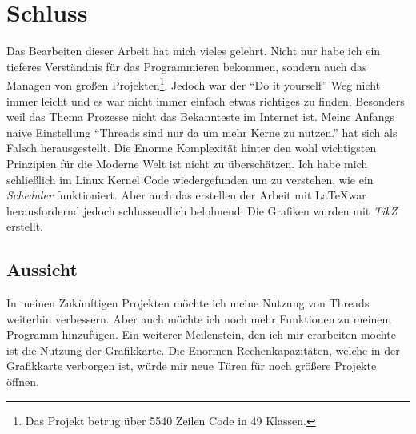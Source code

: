 \section{Schluss}
Das Bearbeiten dieser Arbeit hat mich vieles gelehrt. Nicht nur habe ich ein tieferes Verständnis für das Programmieren bekommen, sondern auch das Managen von großen Projekten\footnote{Das Projekt betrug über 5540 Zeilen Code in 49 Klassen.}. Jedoch war der ``Do it yourself'' Weg nicht immer leicht und es war nicht immer einfach etwas richtiges zu finden. Besonders weil das Thema Prozesse nicht das Bekannteste im Internet ist. Meine Anfangs naive Einstellung ``Threads sind nur da um mehr Kerne zu nutzen.'' hat sich als Falsch herausgestellt. Die Enorme Komplexität hinter den wohl wichtigsten Prinzipien für die Moderne Welt ist nicht zu überschätzen. Ich habe mich schließlich im Linux Kernel Code wiedergefunden um zu verstehen, wie ein \textit{Scheduler} funktioniert. Aber auch das erstellen der Arbeit mit \LaTeX war herausfordernd jedoch schlussendlich belohnend. Die Grafiken wurden mit \textit{TikZ} erstellt.

\subsection{Aussicht}
In meinen Zukünftigen Projekten möchte ich meine Nutzung von Threads weiterhin verbessern. Aber auch möchte ich noch mehr Funktionen zu meinem Programm hinzufügen. Ein weiterer Meilenstein, den ich mir erarbeiten möchte ist die Nutzung der Grafikkarte. Die Enormen Rechenkapazitäten, welche in der Grafikkarte verborgen ist, würde mir neue Türen für noch größere Projekte öffnen.